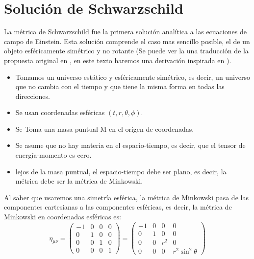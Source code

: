 \section{Solución de Schwarzschild}
\label{sec:solucionSchwarzschild}
\noindent La métrica de Schwarzschild fue la primera solución analítica a las ecuaciones de campo de Einstein. Esta solución comprende el caso mas sencillo posible, el de un objeto esféricamente simétrico y no rotante (Se puede ver la una traducción de la propuesta original en \cite{schwarzschild1999gravitationalfieldmasspoint}, en este texto haremos una derivación inspirada en \cite{eigenchris-2021}).
\begin{itemize}
    \item Tomamos un universo estático y esféricamente simétrico, es decir, un universo que no cambia con el tiempo y que tiene la misma forma en todas las direcciones.
    \item Se usan coordenadas esféricas $(t,r,\theta,\phi)$.
    \item Se Toma una masa puntual M en el origen de coordenadas.
    \item Se asume que no hay materia en el espacio-tiempo, es decir, que el tensor de energía-momento es cero.
    \item lejos de la masa puntual, el espacio-tiempo debe ser plano, es decir, la métrica debe ser la métrica de Minkowski.
\end{itemize}
Al saber que usaremos una simetría esférica, la métrica de Minkowski pasa de las componentes cartesianas a las componentes esféricas, es decir, la métrica de Minkowski en coordenadas esféricas es:
\begin{equation}
    \eta_{\mu \nu}=\left(\begin{array}{cccc}
            -1 & 0 & 0 & 0 \\
            0  & 1 & 0 & 0 \\
            0  & 0 & 1 & 0 \\
            0  & 0 & 0 & 1
        \end{array}\right)=\left(\begin{array}{cccc}
            -1 & 0 & 0     & 0                      \\
            0  & 1 & 0     & 0                      \\
            0  & 0 & r^{2} & 0                      \\
            0  & 0 & 0     & r^{2} \sin ^{2} \theta
        \end{array}\right)
\end{equation}
